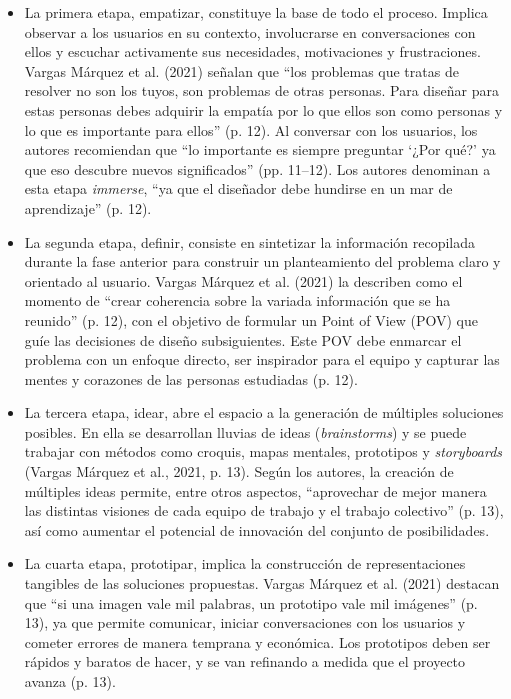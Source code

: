 \begin{itemize}
    \item La primera etapa, empatizar, constituye la base de todo el proceso. Implica observar a los usuarios en su contexto, involucrarse en conversaciones con ellos y escuchar activamente sus necesidades, motivaciones y frustraciones. Vargas Márquez et al. (2021) señalan que ``los problemas que tratas de resolver no son los tuyos, son problemas de otras personas. Para diseñar para estas personas debes adquirir la empatía por lo que ellos son como personas y lo que es importante para ellos'' (p. 12). Al conversar con los usuarios, los autores recomiendan que ``lo importante es siempre preguntar `¿Por qué?' ya que eso descubre nuevos significados'' (pp. 11--12). Los autores denominan a esta etapa \textit{immerse}, ``ya que el diseñador debe hundirse en un mar de aprendizaje'' (p. 12).
    \item La segunda etapa, definir, consiste en sintetizar la información recopilada durante la fase anterior para construir un planteamiento del problema claro y orientado al usuario. Vargas Márquez et al. (2021) la describen como el momento de ``crear coherencia sobre la variada información que se ha reunido'' (p. 12), con el objetivo de formular un Point of View (POV) que guíe las decisiones de diseño subsiguientes. Este POV debe enmarcar el problema con un enfoque directo, ser inspirador para el equipo y capturar las mentes y corazones de las personas estudiadas (p. 12).
    \item La tercera etapa, idear, abre el espacio a la generación de múltiples soluciones posibles. En ella se desarrollan lluvias de ideas (\textit{brainstorms}) y se puede trabajar con métodos como croquis, mapas mentales, prototipos y \textit{storyboards} (Vargas Márquez et al., 2021, p. 13). Según los autores, la creación de múltiples ideas permite, entre otros aspectos, ``aprovechar de mejor manera las distintas visiones de cada equipo de trabajo y el trabajo colectivo'' (p. 13), así como aumentar el potencial de innovación del conjunto de posibilidades.
    \item La cuarta etapa, prototipar, implica la construcción de representaciones tangibles de las soluciones propuestas. Vargas Márquez et al. (2021) destacan que ``si una imagen vale mil palabras, un prototipo vale mil imágenes'' (p. 13), ya que permite comunicar, iniciar conversaciones con los usuarios y cometer errores de manera temprana y económica. Los prototipos deben ser rápidos y baratos de hacer, y se van refinando a medida que el proyecto avanza (p. 13).

\end{itemize}
